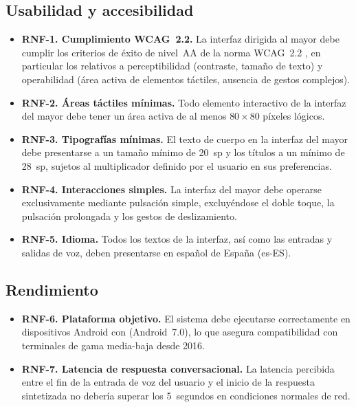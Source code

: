 \subsection*{Usabilidad y accesibilidad}
\begin{itemize}
    \item \textbf{RNF-1. Cumplimiento WCAG~2.2.} La interfaz dirigida al mayor debe cumplir los criterios
    de éxito de nivel~AA de la norma WCAG~2.2 \citep{wcag}, en particular los relativos a perceptibilidad (contraste,
    tamaño de texto) y operabilidad (área activa de elementos táctiles, ausencia de gestos complejos).
    \item \textbf{RNF-2. Áreas táctiles mínimas.} Todo elemento interactivo de la interfaz del mayor debe
    tener un área activa de al menos $80 \times 80$ píxeles lógicos.
    \item \textbf{RNF-3. Tipografías mínimas.} El texto de cuerpo en la interfaz del mayor debe
    presentarse a un tamaño mínimo de 20~sp y los títulos a un mínimo de 28~sp, sujetos al multiplicador
    definido por el usuario en sus preferencias.
    \item \textbf{RNF-4. Interacciones simples.} La interfaz del mayor debe operarse exclusivamente
    mediante pulsación simple, excluyéndose el doble toque, la pulsación prolongada y los gestos de
    deslizamiento.
    \item \textbf{RNF-5. Idioma.} Todos los textos de la interfaz, así como las entradas y salidas de
    voz, deben presentarse en español de España (es-ES).
\end{itemize}

\subsection*{Rendimiento}
\begin{itemize}
    \item \textbf{RNF-6. Plataforma objetivo.} El sistema debe ejecutarse correctamente en dispositivos
    Android con  (Android~7.0), lo que asegura compatibilidad con terminales de gama
    media-baja desde 2016.
    \item \textbf{RNF-7. Latencia de respuesta conversacional.} La latencia percibida entre el fin de la
    entrada de voz del usuario y el inicio de la respuesta sintetizada no debería superar los 5~segundos
    en condiciones normales de red.
\end{itemize}

